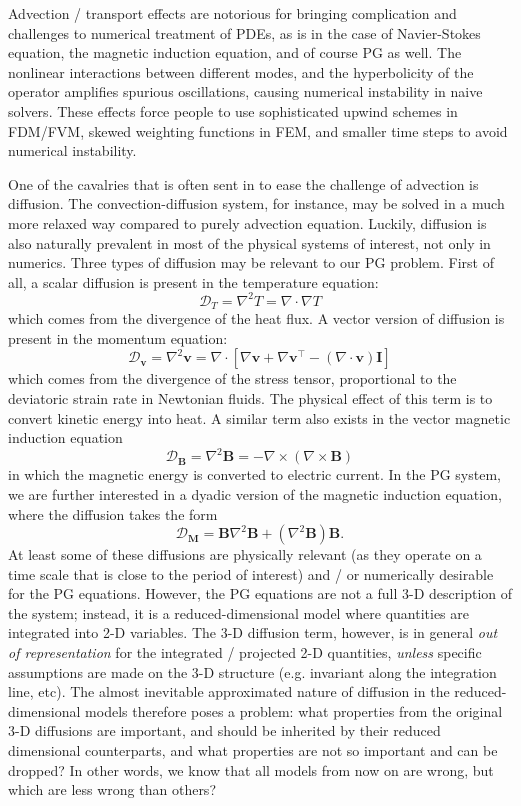 
Advection / transport effects are notorious for bringing complication and challenges to numerical treatment of PDEs, as is in the case of Navier-Stokes equation, the magnetic induction equation, and of course PG as well. The nonlinear interactions between different modes, and the hyperbolicity of the operator amplifies spurious oscillations, causing numerical instability in naive solvers. These effects force people to use sophisticated upwind schemes in FDM/FVM, skewed weighting functions in FEM, and smaller time steps to avoid numerical instability.

One of the cavalries that is often sent in to ease the challenge of advection is diffusion. The convection-diffusion system, for instance, may be solved in a much more relaxed way compared to purely advection equation. Luckily, diffusion is also naturally prevalent in most of the physical systems of interest, not only in numerics. Three types of diffusion may be relevant to our PG problem. First of all, a scalar diffusion is present in the temperature equation:
\begin{equation}\label{eqn:diff_T_3D}
    \mathcal{D}_T = \nabla^2 T = \nabla\cdot \nabla T
\end{equation}
which comes from the divergence of the heat flux. A vector version of diffusion is present in the momentum equation:
\[
    \mathcal{D}_\mathbf{v} = \nabla^2 \mathbf{v} = \nabla\cdot \left[\nabla \mathbf{v} + \nabla \mathbf{v}^\intercal - (\nabla\cdot \mathbf{v})\mathbf{I}\right]
\]
which comes from the divergence of the stress tensor, proportional to the deviatoric strain rate in Newtonian fluids. The physical effect of this term is to convert kinetic energy into heat. A similar term also exists in the vector magnetic induction equation
\[
    \mathcal{D}_\mathbf{B} = \nabla^2 \mathbf{B} = - \nabla\times \left(\nabla \times \mathbf{B}\right)
\]
in which the magnetic energy is converted to electric current. In the PG system, we are further interested in a dyadic version of the magnetic induction equation, where the diffusion takes the form
\[
    \mathcal{D}_\mathbf{M} = \mathbf{B} \nabla^2 \mathbf{B} + (\nabla^2 \mathbf{B}) \mathbf{B}.
\]
At least some of these diffusions are physically relevant (as they operate on a time scale that is close to the period of interest) and / or numerically desirable for the PG equations. However, the PG equations are not a full 3-D description of the system; instead, it is a reduced-dimensional model where quantities are integrated into 2-D variables. The 3-D diffusion term, however, is in general \textit{out of representation} for the integrated / projected 2-D quantities, \textit{unless} specific assumptions are made on the 3-D structure (e.g. invariant along the integration line, etc). 
The almost inevitable approximated nature of diffusion in the reduced-dimensional models therefore poses a problem: what properties from the original 3-D diffusions are important, and should be inherited by their reduced dimensional counterparts, and what properties are not so important and can be dropped? 
In other words, we know that all models from now on are wrong, but which are less wrong than others?

